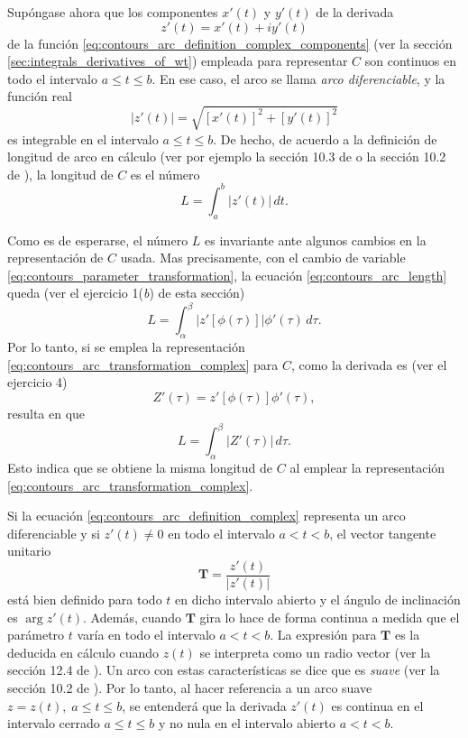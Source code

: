 \documentclass[a4paper]{report}
\newcommand{\T}{\mathbf{T}}
\begin{document}
Supóngase ahora que los componentes \(x'(t)\) y \(y'(t)\) de la derivada 
\[
 z'(t)=x'(t)+iy'(t)
\]
de la función \ref{eq:contours_arc_definition_complex_components} (ver la sección \ref{sec:integrals_derivatives_of_wt}) empleada para representar \(C\) son continuos en todo el intervalo \(a\leq t\leq b\). En ese caso, el arco se llama \emph{arco diferenciable}, y la función real 
\[
 |z'(t)|=\sqrt{[x'(t)]^2+[y'(t)]^2}
\]
es integrable en el intervalo \(a\leq t\leq b\). De hecho, de acuerdo a la definición de longitud de arco en cálculo (ver por ejemplo la sección 10.3 de \cite{larson2009calculus} o la sección 10.2 de \cite{stewart2016essential}), la longitud de \(C\) es el número
\begin{equation}\label{eq:contours_arc_length}
 L=\int_a^b|z'(t)|\,dt. 
\end{equation}

Como es de esperarse, el número \(L\) es invariante ante algunos cambios en la representación de \(C\) usada. Mas precisamente, con el cambio de variable \ref{eq:contours_parameter_transformation}, la ecuación \ref{eq:contours_arc_length} queda (ver el ejercicio 1(\textit{b}) de esta sección)
\[
 L=\int_\alpha^\beta|z'[\phi(\tau)]|\phi'(\tau)\,d\tau.
\]
Por lo tanto, si se emplea la representación \ref{eq:contours_arc_transformation_complex} para \(C\), como la derivada es (ver el ejercicio 4)
\begin{equation}\label{eq:contours_arc_transformation_complex_derivative}
 Z'(\tau)=z'[\phi(\tau)]\phi'(\tau), 
\end{equation}
resulta en que 
\[
 L=\int_\alpha^\beta|Z'(\tau)|\,d\tau.
\]
Esto indica que se obtiene la misma longitud de \(C\) al emplear la representación \ref{eq:contours_arc_transformation_complex}. 

Si la ecuación \ref{eq:contours_arc_definition_complex} representa un arco diferenciable y si \(z'(t)\neq0\) en todo el intervalo \(a<t<b\), el vector tangente unitario
\[
 \T=\frac{z'(t)}{|z'(t)|}
\]
está bien definido para todo \(t\) en dicho intervalo abierto y el ángulo de inclinación es \(\arg z'(t)\). Además, cuando \(\T\) gira lo hace de forma continua a medida que el parámetro \(t\) varía en todo el intervalo \(a<t<b\). La expresión para \(\T\) es la deducida en cálculo cuando \(z(t)\) se interpreta como un radio vector (ver la sección 12.4 de \cite{larson2009calculus}). Un arco con estas características se dice que es \emph{suave} (ver la sección 10.2 de \cite{larson2009calculus}). Por lo tanto, al hacer referencia a un arco suave \(z=z(t),\;a\leq t\leq b\), se entenderá que la derivada \(z'(t)\) es continua en el intervalo cerrado \(a\leq t\leq b\) y no nula en el intervalo abierto \(a<t<b\).
\end{document}
